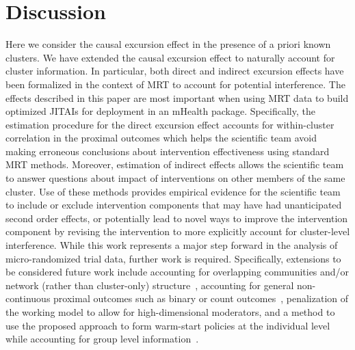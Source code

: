 \documentclass[12pt]{article}
\begin{document}
\section{Discussion}

Here we consider the causal excursion effect in the presence of a priori known clusters.  We have extended the causal excursion effect to naturally account for cluster information. In particular, both direct and indirect excursion effects have been formalized in the context of MRT to account for potential interference.  The effects described in this paper are most important when using MRT data to build optimized JITAIs for deployment in an mHealth package. Specifically, the estimation procedure for the direct excursion effect accounts for within-cluster correlation in the proximal outcomes which helps the scientific team avoid making erroneous conclusions about intervention effectiveness using standard MRT methods.  Moreover, estimation of indirect effects allows the scientific team to answer questions about impact of interventions on other members of the same cluster.  Use of these methods provides empirical evidence for the scientific team to include or exclude intervention components that may have had unanticipated second order effects, or potentially lead to novel ways to improve the intervention component by revising the intervention to more explicitly account for cluster-level interference.  While this work represents a major step forward in the analysis of micro-randomized trial data, further work is required.  Specifically, extensions to be considered future work include accounting for overlapping communities and/or network (rather than cluster-only) structure~\citep{Ogburn2014,Mealli2019}, accounting for general non-continuous proximal outcomes such as binary or count outcomes~\citep{Qian2021}, penalization of the working model to allow for high-dimensional moderators, and a method to use the proposed approach to form warm-start policies at the individual level while accounting for group level information~\citep{Luckett2020}.


\end{document}
